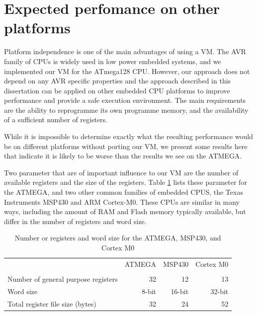 \section{Expected perfomance on other platforms}
\label{sec-evaluation-other-platforms}
Platform independence is one of the main advantages of using a VM. The AVR family of CPUs is widely used in low power embedded systems, and we implemented our VM for the ATmega128 CPU. However, our approach does not depend on any AVR specific properties and the approach described in this dissertation can be applied on other embedded CPU platforms to improve performance and provide a safe execution environment. The main requirements are the ability to reprogramme its own programme memory, and the availability of a sufficient number of registers.

While it is impossible to determine exactly what the resulting performance would be on different platforms without porting our VM, we present some results here that indicate it is likely to be worse than the results we see on the ATMEGA.

Two parameter that are of important influence to our VM are the number of available registers and the size of the registers. Table \ref{tbl-atmega-msp430-m0-registers} lists these parameter for the ATMEGA, and two other common families of embedded CPUS, the Texas Instruments MSP430 and ARM Cortex-M0. These CPUs are similar in many ways, including the amount of RAM and Flash memory typically available, but differ in the number of registers and word size.

\begin{table}
\caption{Number or registers and word size for the ATMEGA, MSP430, and Cortex M0}
\label{tbl-atmega-msp430-m0-registers}
    \begin{tabular}{lrrr}
    \toprule
                                           & ATMEGA       & MSP430     & Cortex M0 \\
                                           & \cite{Atmel:ATMEGA128Datasheet, Atmel:AVRInstructionSetManual}
                                           & \cite{TexasInstrumentsIncorporated:MSP430F1611Datasheet, TexasInstrumentsIncorporated:MSP430x1xxUsersGuide}
                                           & \cite{ARM:2009vz} \\
    \midrule
    \midrule
    Number of general purpose registers    & 32           & 12         & 13        \\
    Word size                              & 8-bit        & 16-bit     & 32-bit    \\
    Total register file size (bytes)       & 32           & 24         & 52        \\
    \bottomrule
    \end{tabular}
\end{table}

